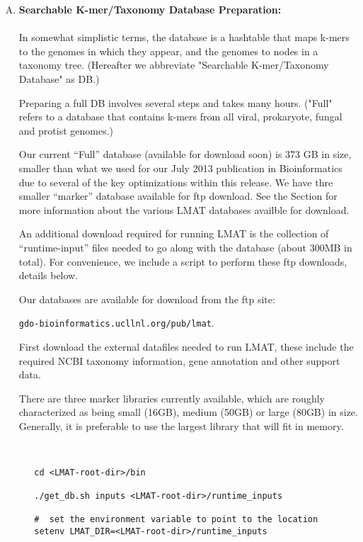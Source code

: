 \documentclass[11pt]{article}
\begin{document}
\begin{enumerate}[A.]
\label{sec:over-a}

   \item 
{
   {\bf Searchable K-mer/Taxonomy Database Preparation:}\\
   \\
    In somewhat simplistic 
     terms, the database is a hashtable that maps k-mers to the genomes in which they
     appear, and the genomes to nodes in a taxonomy tree. (Hereafter
     we abbreviate "Searchable K-mer/Taxonomy Database" as DB.)

     Preparing a full DB involves several steps and takes many hours. 
     ("Full" refers to a database that contains k-mers from
     all viral, prokaryote, fungal and protist genomes.)

     Our current ``Full'' database (available for download soon) is
     373 GB in size, smaller than what we used for our July 2013
     publication in Bioinformatics due to several of the key
     optimizations within this release.  We have thre smaller
     ``marker'' database available for ftp download.
     See the  Section for more
     information about the various LMAT databases availble for
     download.

     An additional download required for running LMAT is the
     collection of ``runtime-input'' files needed to go along with the
     database (about 300MB in total).  For convenience, we include a
     script to perform these ftp downloads, details below.
     

Our databases are available for download from the ftp site:

     \texttt{gdo-bioinformatics.ucllnl.org/pub/lmat}.  


   First download the external datafiles needed to run LMAT, these include the required NCBI taxonomy information, gene annotation and other support data.

   There are three marker libraries currently available, which are
   roughly characterized as being small (16GB), medium (50GB) or large
   (80GB) in size.  Generally, it is preferable to use the largest
   library that will fit in memory.


\begin{verbatim}


   cd <LMAT-root-dir>/bin

   ./get_db.sh inputs <LMAT-root-dir>/runtime_inputs

   #  set the environment variable to point to the location
   setenv LMAT_DIR=<LMAT-root-dir>/runtime_inputs


\end{verbatim}}
\end{enumerate}
\end{document}

